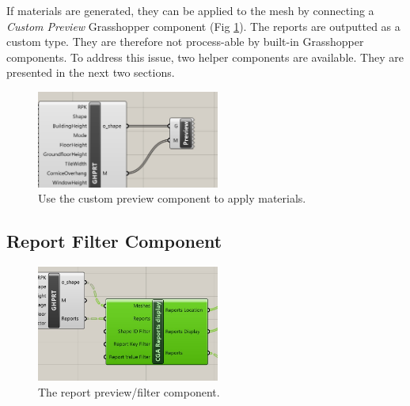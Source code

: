If materials are generated, they can be applied to the mesh by connecting a \textit{Custom Preview} Grasshopper component (Fig \ref{fig:gh_material}). The reports are outputted as a custom type. They are therefore not process-able by built-in Grasshopper components. To address this issue, two helper components are available. They are presented in the next two sections.

\begin{figure}[h]
    \centering
    \includegraphics[width=60mm]{res/man_gh_apply_material}
    \caption{Use the custom preview component to apply materials.}
    \label{fig:gh_material}
\end{figure}

\subsection{Report Filter Component}

\begin{figure}[h]
    \centering
    \includegraphics[width=60mm]{res/man_gh_filter_comp_connections.jpg}
    \caption{The report preview/filter component.}
    \label{fig:gh_filter_first}
\end{figure}

